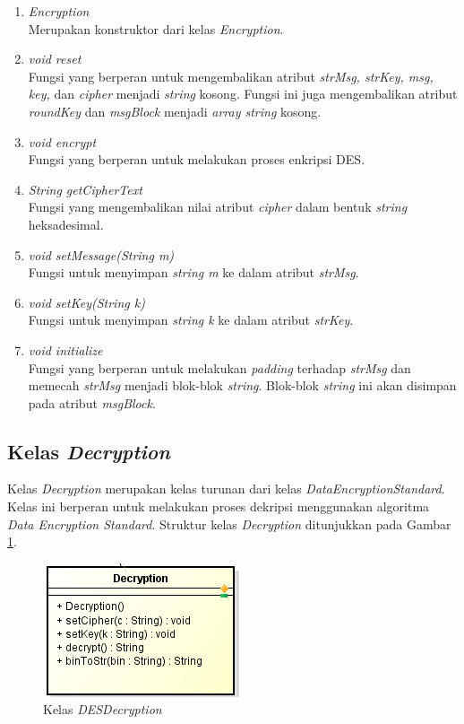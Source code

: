 \begin{enumerate}
	\item \textit{Encryption} \\
	Merupakan konstruktor dari kelas \textit{Encryption}.
	\item \textit{void reset} \\
	Fungsi yang berperan untuk mengembalikan atribut \textit{strMsg, strKey, msg, key,} dan \textit{cipher} menjadi \textit{string} kosong. Fungsi ini juga mengembalikan atribut \textit{roundKey} dan \textit{msgBlock} menjadi \textit{array string} kosong.
	\item \textit{void encrypt} \\
	Fungsi yang berperan untuk melakukan proses enkripsi DES.
	\item \textit{String getCipherText} \\
	Fungsi yang mengembalikan nilai atribut \textit{cipher} dalam bentuk \textit{string} heksadesimal.
	\item \textit{void setMessage(String m)} \\
	Fungsi untuk menyimpan \textit{string m} ke dalam atribut \textit{strMsg}.
	\item \textit{void setKey(String k)} \\
	Fungsi untuk menyimpan \textit{string k} ke dalam atribut \textit{strKey}.
	\item \textit{void initialize} \\
	Fungsi yang berperan untuk melakukan \textit{padding} terhadap \textit{strMsg} dan memecah \textit{strMsg} menjadi blok-blok \textit{string}. Blok-blok \textit{string} ini akan disimpan pada atribut \textit{msgBlock}.
\end{enumerate}

\subsection{Kelas \textit{Decryption}}

Kelas \textit{Decryption} merupakan kelas turunan dari kelas \textit{DataEncryptionStandard}. Kelas ini berperan untuk melakukan proses dekripsi menggunakan algoritma \textit{Data Encryption Standard}. Struktur kelas \textit{Decryption} ditunjukkan pada Gambar \ref{fig:classdesdecryption}.

\begin{figure}[H]
	\centering
	\includegraphics[scale=0.6]{Gambar/class_des_decryption}
	\caption{Kelas \textit{DESDecryption}}\label{fig:classdesdecryption}
\end{figure}

